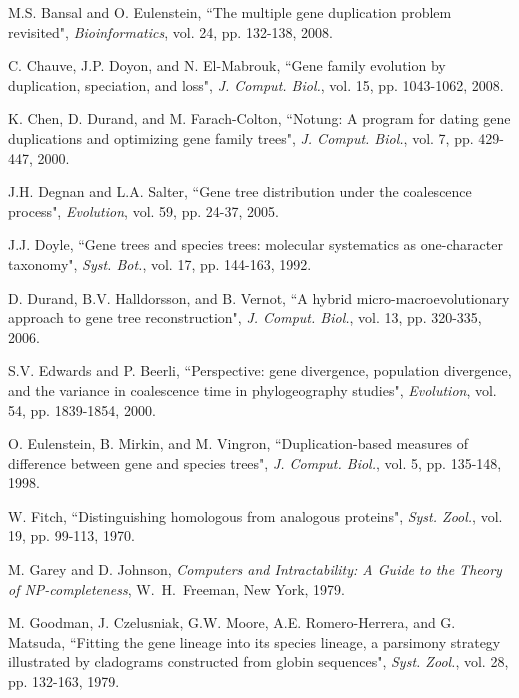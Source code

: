\documentclass[9.5pt,journal,letterpaper,compsoc]{IEEEtran}
\begin{document}
\begin{thebibliography}{99}

M.S. Bansal and O. Eulenstein,
 ``The multiple gene duplication problem revisited",
{\it Bioinformatics}, vol. 24, pp. 132-138, 2008.

C. Chauve, J.P. Doyon, and N. El-Mabrouk,  ``Gene family evolution
by duplication, speciation, and loss",  {\it J. Comput. Biol.}, vol.
15, pp. 1043-1062, 2008.

K. Chen, D. Durand, and M. Farach-Colton,  ``Notung: A program for
dating gene duplications and optimizing gene family trees",
 {\it  J. Comput.  Biol.}, vol. 7, pp. 429-447, 2000.

J.H. Degnan and L.A. Salter, ``Gene tree distribution under the
coalescence process", {\it Evolution}, vol. 59, pp. 24-37, 2005.

J.J. Doyle,  ``Gene trees and species trees: molecular
 systematics as one-character taxonomy",  {\it Syst. Bot.}, vol. 17,
 pp. 144-163, 1992.

D. Durand, B.V. Halldorsson, and B. Vernot, ``A hybrid
micro-macroevolutionary approach to gene tree reconstruction",
 {\it  J. Comput. Biol.}, vol. 13, pp. 320-335, 2006.

S.V. Edwards and P. Beerli, ``Perspective: gene divergence,
population divergence, and the variance in coalescence time in
phylogeography studies",  {\it Evolution}, vol. 54, pp.  1839-1854,
2000.

O. Eulenstein, B. Mirkin, and M.  Vingron, ``Duplication-based
measures of difference between gene and species trees",  {\it J.
Comput. Biol.}, vol. 5, pp. 135-148, 1998.



W. Fitch,  ``Distinguishing homologous from analogous proteins",
{\it Syst. Zool.}, vol. 19, pp. 99-113, 1970.

M. Garey and D. Johnson,  {\it Computers and Intractability: A Guide
to the Theory of NP-completeness},
 W.~H.~Freeman, New York, 1979.

M. Goodman, J. Czelusniak,  G.W. Moore, A.E. Romero-Herrera, and G.
Matsuda,  ``Fitting the gene lineage into its species lineage, a
parsimony strategy illustrated by cladograms constructed from globin
sequences", {\it Syst. Zool.}, vol. 28, pp. 132-163, 1979.


\end{thebibliography}
\end{document}
